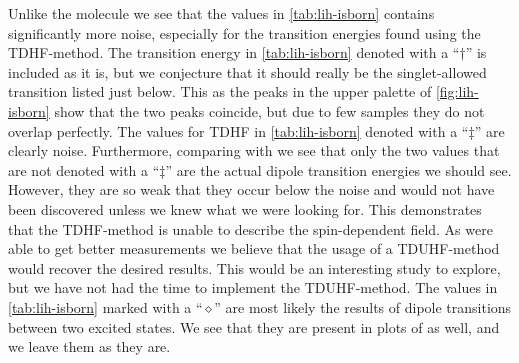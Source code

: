         Unlike the  molecule we see that the values in
        \autoref{tab:lih-isborn} contains significantly more noise, especially
        for the transition energies found using the TDHF-method.
        The transition energy in \autoref{tab:lih-isborn} denoted with a
        ``$\dagger$'' is included as it is, but we conjecture that it should
        really be the singlet-allowed transition listed just below.
        This as the peaks in the upper palette of \autoref{fig:lih-isborn} show
        that the two peaks coincide, but due to few samples they do not overlap
        perfectly.
        The values for TDHF in \autoref{tab:lih-isborn} denoted with a
        ``$\ddagger$'' are clearly noise.
        Furthermore, comparing with \citeauthor{isborn} \cite{isborn} we see
        that only the two values that are not denoted with a ``$\ddagger$'' are
        the actual dipole transition energies we should see.
        However, they are so weak that they occur below the noise and would not
        have been discovered unless we knew what we were looking for.
        This demonstrates that the TDHF-method is unable to describe the
        spin-dependent field.
        As \citeauthor{isborn} \cite{isborn} were able to get better
        measurements we believe that the usage of a TDUHF-method would recover
        the desired results.
        This would be an interesting study to explore, but we have not had the
        time to implement the TDUHF-method.
        The values in \autoref{tab:lih-isborn} marked with a ``$\diamond$'' are
        most likely the results of dipole transitions between two excited
        states.
        We see that they are present in plots of \citeauthor{isborn}
        \cite{isborn} as well, and we leave them as they are.

